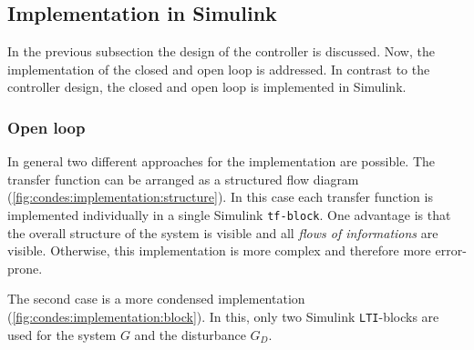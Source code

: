 \subsection{Implementation in Simulink} \label{sec:condes:implementation_simulink}

In the previous subsection the design of the controller is discussed.
Now, the implementation of the closed and open loop is addressed.
In contrast to the controller design, the closed and open loop is implemented in Simulink.

\subsubsection*{Open loop} \label{sec:condes:implementation_simulink:open_loop}

In general two different approaches for the implementation are possible.
The transfer function can be arranged as a structured flow diagram (\autoref{fig:condes:implementation:structure}).
In this case each transfer function is implemented individually in a single Simulink \texttt{tf-block}.
One advantage is that the overall structure of the system is visible and all \textit{flows of informations} are visible.
Otherwise, this implementation is more complex and therefore more error-prone.

The second case is a more condensed implementation (\autoref{fig:condes:implementation:block}).
In this, only two Simulink \texttt{LTI}-blocks are used for the system $G$ and the disturbance $G_D$.

